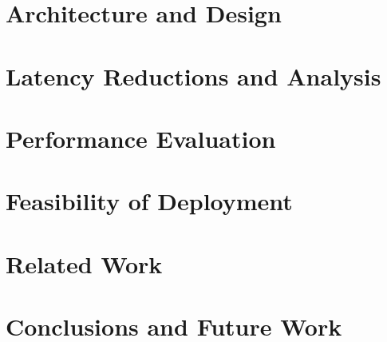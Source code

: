 \documentclass[10pt,journal]{IEEEtran}
\begin{document}
\section{Architecture and Design}
\label{sec:design}



\section{Latency Reductions and Analysis}
\label{sec:analysis}



\section{Performance Evaluation}
\label{sec:perfeval}




\section{Feasibility of Deployment}
\label{sec:deployability}



\section{Related Work}
\label{sec:related}



\section{Conclusions and Future Work}
\label{sec:conclusions}


\end{document}
